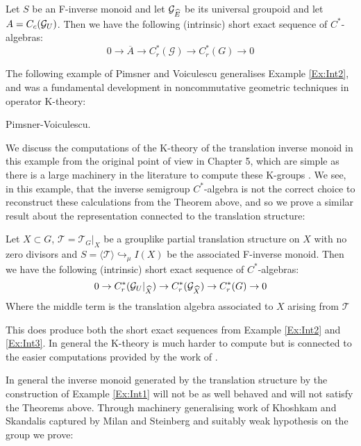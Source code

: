 \begin{thm}\label{Ex:Int3}
Let $S$ be an F-inverse monoid and let $\mathcal{G}_{\widehat{E}}$ be its universal groupoid and let $A=C_{c}(\mathcal{G}_{U})$. Then we have the following (intrinsic) short exact sequence of $C^{*}$-algebras:
\begin{equation*}
0 \rightarrow \overline{A} \rightarrow C^{*}_{r}(\mathcal{G}) \rightarrow C^{*}_{r}(G) \rightarrow 0
\end{equation*}
\end{thm}

The following example of Pimsner and Voiculescu generalises Example \ref{Ex:Int2}, and was a fundamental development in noncommutative geometric techniques in operator K-theory:

\begin{example}
Pimsner-Voiculescu.
\end{example}

We discuss the computations of the K-theory of the translation inverse monoid in this example from the original point of view \cite{MR670181} in Chapter 5, which are simple as there is a large machinery in the literature to compute these K-groups \cite{Nor-2012,CEL-2}. We see, in this example, that the inverse semigroup $C^{*}$-algebra is not the correct choice to reconstruct these calculations from the Theorem above, and so we prove a similar result about the representation connected to the translation structure:

\begin{thm}
Let $X \subset G$, $\mathcal{T}=\mathcal{T}_{G}|_{X}$ be a grouplike partial translation structure on $X$ with no zero divisors and $S=\langle \mathcal{T} \rangle \hookrightarrow_{\mu} I(X)$ be the associated F-inverse monoid. Then we have the following (intrinsic) short exact sequence of $C^{*}$-algebras:
\begin{equation}\label{eqn1}
0 \rightarrow C^{*}_{r}(\mathcal{G}_{U}|_{\widehat{X}}) \rightarrow C^{*}_{r}(\mathcal{G}_{\widehat{X}}) \rightarrow C^{*}_{r}(G) \rightarrow 0
\end{equation}
Where the middle term is the translation algebra associated to $X$ arising from $\mathcal{T}$
\end{thm}

This does produce both the short exact sequences from Example \ref{Ex:Int2} and \ref{Ex:Int3}. In general the K-theory is much harder to compute but is connected to the easier computations provided by the work of \cite{Nor-2012,CEL-2}.

In general the inverse monoid generated by the translation structure by the construction of Example \ref{Ex:Int1} will not be as well behaved and will not satisfy the Theorems above.
Through machinery generalising work of Khoshkam and Skandalis \cite{MR1900993} captured by Milan and Steinberg \cite{Milan-Steinberg} and suitably weak hypothesis on the group we prove:

